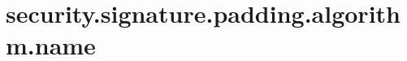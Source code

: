 \section{security.signature.padding.algorithm.name}
\label{configuration:SecuritySignaturePaddingAlgorithmName}
\TODO
